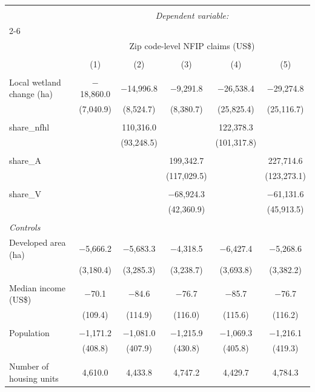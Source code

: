 \begin{tabular}{@{\extracolsep{5pt}}lccccc} 
\\[-1.8ex]\hline 
\hline \\[-1.8ex] 
 & \multicolumn{5}{c}{\textit{Dependent variable:}} \\ 
\cline{2-6} 
\\[-1.8ex] & \multicolumn{5}{c}{Zip code-level NFIP claims (US\$)} \\ 
\\[-1.8ex] & (1) & (2) & (3) & (4) & (5)\\ 
\hline \\[-1.8ex] 
 Local wetland change (ha) & $-$18,860.0 & $-$14,996.8 & $-$9,291.8 & $-$26,538.4 & $-$29,274.8 \\ 
  & (7,040.9) & (8,524.7) & (8,380.7) & (25,825.4) & (25,116.7) \\ 
  & & & & & \\ 
 share\_nfhl &  & 110,316.0 &  & 122,378.3 &  \\ 
  &  & (93,248.5) &  & (101,317.8) &  \\ 
  & & & & & \\ 
 share\_A &  &  & 199,342.7 &  & 227,714.6 \\ 
  &  &  & (117,029.5) &  & (123,273.1) \\ 
  & & & & & \\ 
 share\_V &  &  & $-$68,924.3 &  & $-$61,131.6 \\ 
  &  &  & (42,360.9) &  & (45,913.5) \\ 
  & & & & & \\ 
 \emph{Controls} \\ Developed area (ha) & $-$5,666.2 & $-$5,683.3 & $-$4,318.5 & $-$6,427.4 & $-$5,268.6 \\ 
  & (3,180.4) & (3,285.3) & (3,238.7) & (3,693.8) & (3,382.2) \\ 
  & & & & & \\ 
 Median income (US\$) & $-$70.1 & $-$84.6 & $-$76.7 & $-$85.7 & $-$76.7 \\ 
  & (109.4) & (114.9) & (116.0) & (115.6) & (116.2) \\ 
  & & & & & \\ 
 Population & $-$1,171.2 & $-$1,081.0 & $-$1,215.9 & $-$1,069.3 & $-$1,216.1 \\ 
  & (408.8) & (407.9) & (430.8) & (405.8) & (419.3) \\ 
  & & & & & \\ 
 Number of housing units & 4,610.0 & 4,433.8 & 4,747.2 & 4,429.7 & 4,784.3 \\ 

\end{tabular}
